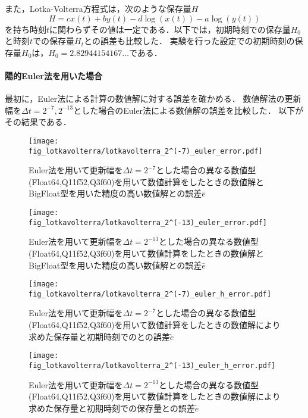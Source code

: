 また，Lotka-Volterra方程式は，次のような保存量$H$
\begin{equation}
    H = cx(t) + by(t) -d \log\left(x(t)\right) - a \log\left(y(t)\right)
\end{equation}
を持ち時刻$t$に関わらずその値は一定である．以下では，初期時刻での保存量$H_0$と時刻$t$での保存量$H_t$との誤差も比較した．
実験を行った設定での初期時刻の保存量$H_0$は，$H_0 =2.82944154167\dots$である．
\paragraph*{陽的Euler法を用いた場合}
最初に，Euler法による計算の数値解に対する誤差を確かめる．
数値解法の更新幅を$\Delta t = 2^{-7},2^{-13}$とした場合のEuler法による数値解の誤差を比較した．
以下がその結果である．
\begin{figure}[H]
    \centering
    \begin{minipage}[b]{0.48\columnwidth}
        \centering
        \texttt{[image: fig\_lotkavolterra/lotkavolterra\_2^(-7)\_euler\_error.pdf]}
        \caption{Euler法を用いて更新幅を$\Delta t = 2^{-7}$とした場合の異なる数値型(Float64,Q11f52,Q3f60)を用いて数値計算をしたときの数値解とBigFloat型を用いた精度の高い数値解との誤差$\bar{e}$}
        \label{fig:lotkavolterra_2^(-7)_euler_error}
    \end{minipage}
    \hspace{0.01\columnwidth}
    \begin{minipage}[b]{0.48\columnwidth}
        \centering
        \texttt{[image: fig\_lotkavolterra/lotkavolterra\_2^(-13)\_euler\_error.pdf]}
        \caption{Euler法を用いて更新幅を$\Delta t =  2^{-13}$とした場合の異なる数値型(Float64,Q11f52,Q3f60)を用いて数値計算をしたときの数値解とBigFloat型を用いた精度の高い数値解との誤差$\bar{e}$}
        \label{fig:lotkavolterra_2^(-13)_euler_error}
    \end{minipage}
\end{figure}

\begin{figure}[H]
    \centering
    \begin{minipage}[b]{0.48\columnwidth}
        \centering
        \texttt{[image: fig\_lotkavolterra/lotkavolterra\_2^(-7)\_euler\_h\_error.pdf]}
        \caption{Euler法を用いて更新幅を$\Delta t = 2^{-7}$とした場合の異なる数値型(Float64,Q11f52,Q3f60)を用いて数値計算をしたときの数値解により求めた保存量と初期時刻でのとの誤差$\tilde{e}$}
        \label{fig:lotkavolterra_2^(-7)_euler_h_error}
    \end{minipage}
    \hspace{0.01\columnwidth}
    \begin{minipage}[b]{0.48\columnwidth}
        \centering
        \texttt{[image: fig\_lotkavolterra/lotkavolterra\_2^(-13)\_euler\_h\_error.pdf]}
        \caption{Euler法を用いて更新幅を$\Delta t =  2^{-13}$とした場合の異なる数値型(Float64,Q11f52,Q3f60)を用いて数値計算をしたときの数値解により求めた保存量と初期時刻での保存量との誤差$\tilde{e}$}
        \label{fig:lotkavolterra_2^(-13)_euler_h_error}
    \end{minipage}
\end{figure}

